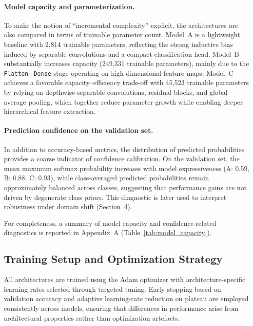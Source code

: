 \documentclass{article}
\begin{document}
\paragraph{Model capacity and parameterization.}

To make the notion of ``incremental complexity'' explicit, the architectures are also compared in terms of trainable parameter count.
Model~A is a lightweight baseline with 2{,}814 trainable parameters, reflecting the strong inductive bias induced by separable convolutions and a compact classification head.
Model~B substantially increases capacity (249{,}331 trainable parameters), mainly due to the \texttt{Flatten}+\texttt{Dense} stage operating on high-dimensional feature maps.
Model~C achieves a favorable capacity--efficiency trade-off with 45{,}523 trainable parameters by relying on depthwise-separable convolutions, residual blocks, and global average pooling, which together reduce parameter growth while enabling deeper hierarchical feature extraction.

\paragraph{Prediction confidence on the validation set.}

In addition to accuracy-based metrics, the distribution of predicted probabilities provides a coarse indicator of confidence calibration.
On the validation set, the mean maximum softmax probability increases with model expressiveness (A: 0.59, B: 0.88, C: 0.93), while class-averaged predicted probabilities remain approximately balanced across classes, suggesting that performance gains are not driven by degenerate class priors.
This diagnostic is later used to interpret robustness under domain shift (Section~4).

For completeness, a summary of model capacity and confidence-related diagnostics is reported in
Appendix~A (Table~\ref{tab:model_capacity}).

\subsection{Training Setup and Optimization Strategy}

All architectures are trained using the Adam optimizer with architecture-specific learning rates selected through targeted tuning. Early stopping based on validation accuracy and adaptive learning-rate reduction on plateau are employed consistently across models, ensuring that differences in performance arise from architectural properties rather than optimization artefacts.
\end{document}

